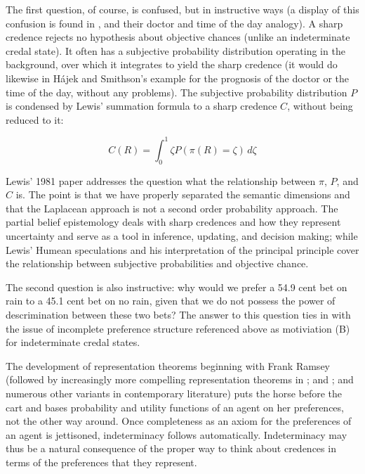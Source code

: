 The first question, of course, is confused, but in
instructive ways (a display of this confusion is found
in , and their doctor
and time of the day analogy). A sharp credence rejects
no hypothesis about objective chances (unlike an
indeterminate credal state). It often has a subjective
probability distribution operating in the background,
over which it integrates to yield the sharp credence
(it would do likewise in H{\'a}jek and Smithson's
example for the prognosis of the doctor or the time of
the day, without any problems). The subjective
probability distribution $P$ is condensed by Lewis'
summation formula to a sharp credence $C$, without
being reduced to it:

\begin{equation}
  \label{eq:s2}
  C(R)=\int_{0}^{1}\zeta{}P(\pi(R)=\zeta)\,d\zeta
\end{equation}

Lewis' 1981 paper  addresses the question what the
relationship between $\pi$, $P$, and $C$ is. The point
is that we have properly separated the semantic
dimensions and that the Laplacean approach is not a
second order probability approach. The partial belief
epistemology deals with sharp credences and how they
represent uncertainty and serve as a tool in inference,
updating, and decision making; while Lewis' Humean
speculations and his interpretation of the principal
principle cover the relationship between subjective
probabilities and objective chance.

The second question is also instructive: why would we
prefer a 54.9 cent bet on rain to a 45.1 cent bet on no
rain, given that we do not possess the power of
descrimination between these two bets? The answer to
this question ties in with the issue of incomplete
preference structure referenced above as motiviation
(B) for indeterminate credal states.

The development of representation theorems beginning
with Frank Ramsey (followed by increasingly more
compelling representation theorems in
; and ; and
numerous other variants in contemporary literature)
puts the horse before the cart and bases probability
and utility functions of an agent on her preferences,
not the other way around. Once completeness as an axiom
for the preferences of an agent is jettisoned,
indeterminacy follows automatically. Indeterminacy may
thus be a natural consequence of the proper way to
think about credences in terms of the preferences that
they represent.

